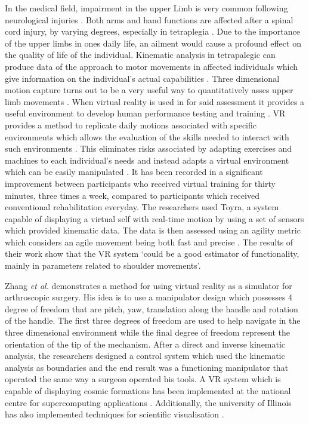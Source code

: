 In the medical field, impairment in the upper Limb is very common following neurological injuries \cite{murphy2006three}. Both arms and hand functions are affected after a spinal cord injury, by varying degrees, especially in tetraplegia \cite{harvey2001hand}.  Due to the importance of the upper limbs in ones daily life, an ailment would cause a profound effect on the quality of life of the individual. Kinematic analysis in tetrapalegic can produce data of the approach to motor movements in affected individuals \cite{cacho2011upper} which give information on the individual's actual capabilities \cite{murphy2006three}. Three dimensional motion capture turns out to be a very useful way to quantitatively asses upper limb movements \cite{de2010kinematic}. When virtual reality is used in for said assessment it provides a useful environment to develop human performance testing and training \cite{lee2003virtual}. VR provides a method to replicate daily motions associated with specific environments which allows the evaluation of the skills needed to interact with such environments \cite{dimbwadyo2013clinical}. This eliminates risks associated by adapting exercises and machines to each individual's needs and instead adapts a virtual environment which can be easily manipulated \cite{lee2003virtual}. It has been recorded in \cite{dimbwadyo2016activities} a significant improvement between participants who received virtual training for thirty minutes, three times a week, compared to participants which received conventional rehabilitation everyday. The researchers used Toyra\textregistered, a system capable of displaying a virtual self with real-time motion by using a set of sensors which provided kinematic data. The data is then assessed using an agility metric which considers an agile movement being both fast and precise \cite{trincado2014kinematic}. The results of their work show that the VR system `could be a good estimator of functionality, mainly in parameters related to shoulder movements'\cite{dimbwadyo2016activities}. 

Zhang \textit{et al.} demonstrates a method for using virtual reality as a simulator for arthroscopic surgery. His idea is to use a manipulator design which possesses 4 degree of freedom that are pitch, yaw, translation along the handle and rotation of the handle. The first three degrees of freedom are used to help navigate in the three dimensional environment while the final degree of freedom represent the orientation of the tip of the mechanism. After a direct and inverse kinematic analysis, the researchers designed a control system which used the kinematic analysis as boundaries and the end result was a functioning manipulator that operated the same way a surgeon operated his tools. A VR system which is capable of displaying cosmic formations has been implemented at the national centre for supercomputing applications \cite{song1993cosmic}. Additionally, the university of Illinois has also implemented techniques for scientific visualisation \cite{cruz1993surround, cruz1993scientists}.

